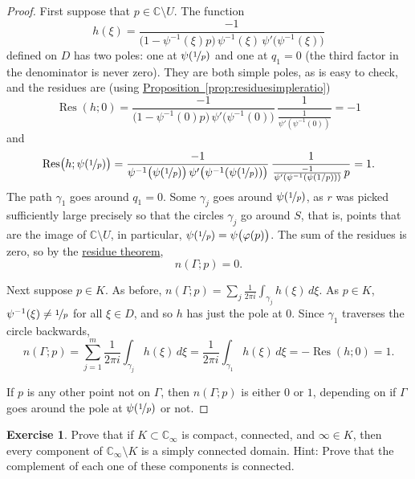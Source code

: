 \documentclass[12pt,openany]{book}
\newcommand{\C}{{\mathbb{C}}}
\theoremstyle{plain}
\theoremstyle{remark}
\theoremstyle{definition}
\newenvironment{exbox}{%
    \def\FrameCommand{\vrule width 1pt \relax\hspace{10pt}}%
    \MakeFramed{\advance\hsize-\width\FrameRestore}%
}{%
    \endMakeFramed
}
\theoremstyle{exercise}
\newtheorem{exercise}{Exercise}[section]
\theoremstyle{example}
\newcommand{\propref}[1]{\hyperref[#1]{Proposition~\ref*{#1}}}
\begin{document}
\begin{proof}
First suppose that $p \in \C \setminus U$.
The function 
\begin{equation*}
h(\xi) =
\frac{-1}{ \bigl( 1-\psi^{-1}(\xi)p \bigr)
\,
\psi^{-1}(\xi)
\,
\psi' \bigl(\psi^{-1}(\xi)\bigr)}
\end{equation*}
defined on $D$ has two poles: one at $\psi(\nicefrac{1}{p})$ and one
at $q_1=0$ (the third factor in the denominator is never zero).
They are both simple poles, as is easy to check, and the residues are (using
\propref{prop:residuesimpleratio})
\begin{equation*}
\operatorname{Res}(h;0) = 
\frac{-1}{ \bigl( 1-\psi^{-1}(0)p \bigr)
\,
\psi' \bigl(\psi^{-1}(0)\bigr)}
\,
\frac{1}{\frac{1}{\psi'(\psi^{-1}(0))}}
=
-1
\end{equation*}
and
\begin{equation*}
\operatorname{Res}\bigl(h;\psi(\nicefrac{1}{p})\bigr)
=
\frac{-1}{
\psi^{-1}\bigl(\psi(\nicefrac{1}{p})\bigr)
\,
\psi' \bigl(\psi^{-1}(\psi(\nicefrac{1}{p}))\bigr)
}
\,
\frac{1}{
\frac{-1}{\psi'(\psi^{-1}(\psi(1/p)))}
\, p
}
=
1 .
\end{equation*}
The path $\gamma_1$ goes around $q_1=0$.
Some $\gamma_j$ goes around
$\psi(\nicefrac{1}{p})$, as $r$ was picked sufficiently large
precisely so that the circles $\gamma_j$ go around $S$, that is, points that
are the image of $\C \setminus U$,
in particular, $\psi(\nicefrac{1}{p})=\psi\bigl(\varphi(p)\bigr)$.
The sum of the residues is zero, so 
by the \hyperref[thm:residue]{residue theorem},
\begin{equation*}
n(\Gamma;p) = 0 .
\end{equation*}

Next suppose $p \in K$.  As before,
$n(\Gamma;p) = 
\sum_j
\frac{1}{2\pi i}
\int_{\gamma_j} h(\xi) \, d\xi$.
As $p \in K$, $\psi^{-1}(\xi) \neq \nicefrac{1}{p}$ for all $\xi \in D$,
and so $h$ has just the pole at $0$.
Since $\gamma_1$ traverses the circle backwards,
\begin{equation*}
n(\Gamma;p) = 
\sum_{j=1}^m
\frac{1}{2\pi i}
\int_{\gamma_j} h(\xi) \, d\xi 
=
\frac{1}{2\pi i}
\int_{\gamma_1} h(\xi) \, d\xi 
= - \operatorname{Res}(h;0) = 1 .
\end{equation*}

If $p$ is any other point not on $\Gamma$, then $n(\Gamma;p)$
is either $0$ or $1$, depending on if $\Gamma$ goes around the
pole at $\psi(\nicefrac{1}{p})$ or not.
\end{proof}

\begin{exbox}
\begin{exercise}
Prove that if $K \subset \C_\infty$ is compact, connected,
and $\infty \in K$, then 
every component of $\C_\infty \setminus K$ is a simply connected domain.
Hint: Prove that the complement of each one of these components is connected.
\end{exercise}
\end{exbox}
\end{document}
